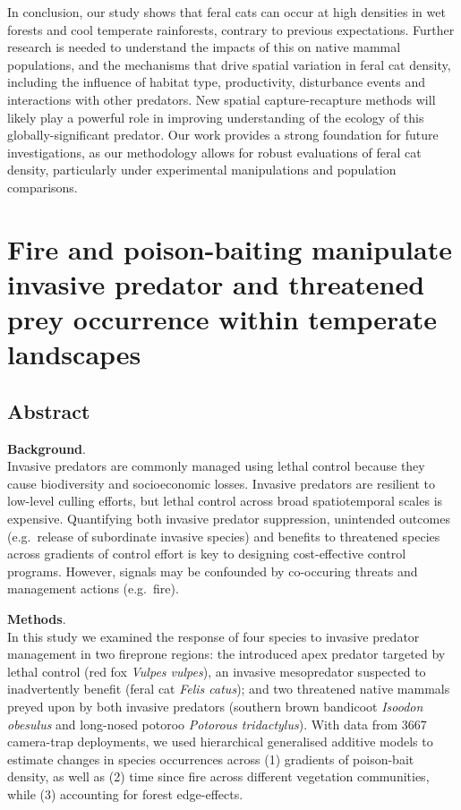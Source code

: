 \documentclass[11pt,a4paper,titlepage,twoside,openright]{style/unimelbthesis}
\begin{document}
\begin{mainmatter}
In conclusion, our study shows that feral cats can occur at high densities in wet forests and cool temperate rainforests, contrary to previous expectations. Further research is needed to understand the impacts of this on native mammal populations, and the mechanisms that drive spatial variation in feral cat density, including the influence of habitat type, productivity, disturbance events and interactions with other predators. New spatial capture-recapture methods will likely play a powerful role in improving understanding of the ecology of this globally-significant predator. Our work provides a strong foundation for future investigations, as our methodology allows for robust evaluations of feral cat density, particularly under experimental manipulations and population comparisons.

\hypertarget{occ}{%
\chapter{Fire and poison-baiting manipulate invasive predator and threatened prey occurrence within temperate landscapes}\label{occ}}

\hypertarget{abstract-1}{%
\section*{Abstract}\label{abstract-1}}

\textbf{Background}.\\
Invasive predators are commonly managed using lethal control because they cause biodiversity and socioeconomic losses. Invasive predators are resilient to low-level culling efforts, but lethal control across broad spatiotemporal scales is expensive. Quantifying both invasive predator suppression, unintended outcomes (e.g.~release of subordinate invasive species) and benefits to threatened species across gradients of control effort is key to designing cost-effective control programs. However, signals may be confounded by co-occuring threats and management actions (e.g.~fire).

\textbf{Methods}.\\
In this study we examined the response of four species to invasive predator management in two fireprone regions: the introduced apex predator targeted by lethal control (red fox \emph{Vulpes vulpes}), an invasive mesopredator suspected to inadvertently benefit (feral cat \emph{Felis catus}); and two threatened native mammals preyed upon by both invasive predators (southern brown bandicoot \emph{Isoodon obesulus} and long-nosed potoroo \emph{Potorous tridactylus}). With data from 3667 camera-trap deployments, we used hierarchical generalised additive models to estimate changes in species occurrences across (1) gradients of poison-bait density, as well as (2) time since fire across different vegetation communities, while (3) accounting for forest edge-effects.


\end{mainmatter}
\end{document}
